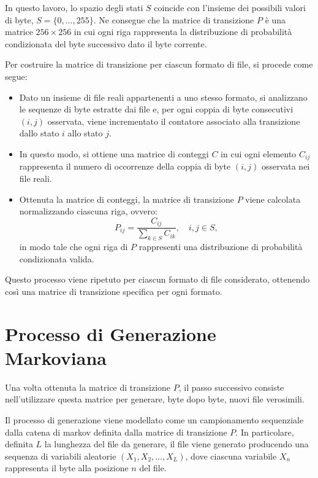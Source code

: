 \documentclass{report}
\begin{document}
\bigskip

In questo lavoro, lo spazio degli stati \(S\) coincide con l'insieme dei possibili valori di byte,
\(S = \{0, \dots, 255\}\).
Ne consegue che la matrice di transizione \(P\) è una matrice \(256 \times 256\) in cui
ogni riga rappresenta la distribuzione di probabilità condizionata del byte successivo dato il byte corrente.

\bigskip

Per costruire la matrice di transizione per ciascun formato di file, si procede come segue:

\bigskip   
\begin{itemize}
    \item Dato un insieme di file reali appartenenti a uno stesso formato, si analizzano le
sequenze di byte estratte dai file e, per ogni coppia di byte consecutivi
\((i,j)\) osservata, viene incrementato il contatore associato alla transizione
dallo stato \(i\) allo stato \(j\).

    \item In questo modo, si ottiene una matrice di conteggi \(C\) in cui ogni elemento
\(C_{ij}\) rappresenta il numero di occorrenze della coppia di byte \((i,j)\) osservata
nei file reali.

     \item Ottenuta la matrice di conteggi, la matrice di transizione \(P\) viene calcolata normalizzando ciascuna riga, 
ovvero:
\[
P_{ij} = \frac{C_{ij}}{\sum_{k \in S} C_{ik}}, \quad i,j \in S,
\]
in modo tale che ogni riga di \(P\) rappresenti una distribuzione di probabilità condizionata valida.

     
\end{itemize}


Questo processo viene ripetuto per ciascun formato di file considerato,
ottenendo così una matrice di transizione specifica per ogni formato.


\section{Processo di Generazione Markoviana}

Una volta ottenuta la matrice di transizione \(P\), il passo successivo consiste nell'utilizzare questa matrice
per generare, byte dopo byte, nuovi file verosimili.

Il processo di generazione viene modellato come un campionamento sequenziale dalla catena di markov
definita dalla matrice di transizione \(P\).
In particolare, definita \(L\) la lunghezza del file da generare, il file viene generato producendo
una sequenza di variabili aleatorie \((X_1, X_2, \dots, X_L)\), dove ciascuna variabile \(X_n\) rappresenta il byte 
alla posizione \(n\) del file.
\end{document}
